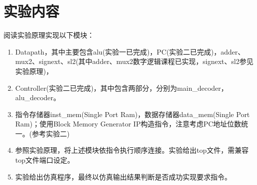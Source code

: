 \section{实验内容}
阅读实验原理实现以下模块：
\begin{enumerate}[(1)]
    \item Datapath，其中主要包含alu(实验一已完成)，PC(实验二已完成)，adder、mux2、signext、sl2(其中adder、mux2数字逻辑课程已实现，signext、sl2参见实验原理)，
    \item Controller(实验二已完成)，其中包含两部分，分别为main\_decoder，alu\_decoder。
    \item 指令存储器inst\_mem(Single Port Ram)，数据存储器data\_mem(Single Port Ram)；使用Block Memory Generator IP构造指令，注意考虑PC地址位数统一。(参考实验二)
    \item 参照实验原理，将上述模块依指令执行顺序连接。实验给出top文件，需兼容top文件端口设定。
    \item 实验给出仿真程序，最终以仿真输出结果判断是否成功实现要求指令。
\end{enumerate}